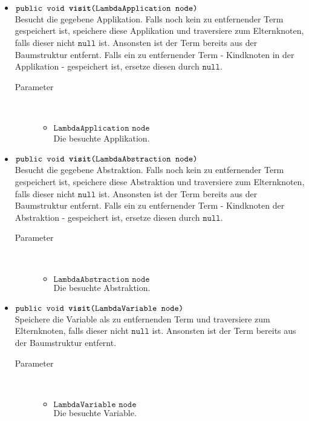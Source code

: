 \begin{description}
\begin{itemize}
		\item $\texttt{public void \textbf{visit}(LambdaApplication node)}$ \\ Besucht die gegebene Applikation. Falls noch kein zu entfernender Term gespeichert ist, speichere diese Applikation und traversiere zum Elternknoten, falls dieser nicht $\texttt{null}$ ist. Ansonsten ist der Term bereits aus der Baumstruktur entfernt. Falls ein zu entfernender Term - Kindknoten in der Applikation - gespeichert ist, ersetze diesen durch $\texttt{null}$.
		\begin{description}
			\item[Parameter] \hfill \\
			\vspace{-.8cm}
			\begin{itemize}
				\item $\texttt{LambdaApplication node}$ \\ Die besuchte Applikation.
			\end{itemize}
		\end{description}
		
		\item $\texttt{public void \textbf{visit}(LambdaAbstraction node)}$ \\ Besucht die gegebene Abstraktion. Falls noch kein zu entfernender Term gespeichert ist, speichere diese Abstraktion und traversiere zum Elternknoten, falls dieser nicht $\texttt{null}$ ist. Ansonsten ist der Term bereits aus der Baumstruktur entfernt. Falls ein zu entfernender Term - Kindknoten der Abstraktion - gespeichert ist, ersetze diesen durch $\texttt{null}$.
		\begin{description}
			\item[Parameter] \hfill \\
			\vspace{-.8cm}
			\begin{itemize}
				\item $\texttt{LambdaAbstraction node}$ \\ Die besuchte Abstraktion.
			\end{itemize}
		\end{description}
		
		\item $\texttt{public void \textbf{visit}(LambdaVariable node)}$ \\ Speichere die Variable als zu entfernenden Term und traversiere zum Elternknoten, falls dieser nicht $\texttt{null}$ ist. Ansonsten ist der Term bereits aus der Baumstruktur entfernt.
		\begin{description}
			\item[Parameter] \hfill \\
			\vspace{-.8cm}
			\begin{itemize}
				\item $\texttt{LambdaVariable node}$ \\ Die besuchte Variable.
			\end{itemize}
		\end{description}
	\end{itemize}
\end{description}

